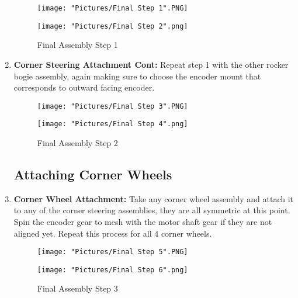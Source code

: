 \documentclass[12pt]{article}
\begin{document}
\begin{enumerate}
\begin{figure}[H]
  \centering
  \begin{minipage}[b]{0.45\textwidth}
    \texttt{[image: "Pictures/Final Step 1".PNG]}
  \end{minipage}
  \hfill
  \begin{minipage}[b]{0.45\textwidth}
    \texttt{[image: "Pictures/Final Step 2".png]}
  \end{minipage}
  \caption{Final Assembly Step 1}
\end{figure}


\item \textbf{Corner Steering Attachment Cont: } Repeat step 1 with the other rocker bogie assembly, again making sure to choose the encoder mount that corresponds to outward facing encoder. 

\begin{figure}[H]
  \centering
  \begin{minipage}[b]{0.45\textwidth}
    \texttt{[image: "Pictures/Final Step 3".PNG]}
  \end{minipage}
  \hfill
  \begin{minipage}[b]{0.45\textwidth}
    \texttt{[image: "Pictures/Final Step 4".png]}
  \end{minipage}
  \caption{Final Assembly Step 2}
\end{figure}

\subsection{Attaching Corner Wheels}

\item \textbf{Corner Wheel Attachment: }Take any corner wheel assembly and attach it to any of the corner steering assemblies, they are all symmetric at this point. Spin the encoder gear to mesh with the motor shaft gear if they are not aligned yet. Repeat this process for all 4 corner wheels. 

\begin{figure}[H]
  \centering
  \begin{minipage}[b]{0.45\textwidth}
    \texttt{[image: "Pictures/Final Step 5".PNG]}
  \end{minipage}
  \hfill
  \begin{minipage}[b]{0.45\textwidth}
    \texttt{[image: "Pictures/Final Step 6".png]}
  \end{minipage}
  \caption{Final Assembly Step 3}
\end{figure}


\end{enumerate}
\end{document}
